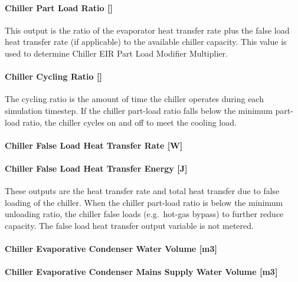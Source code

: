 \paragraph{Chiller Part Load Ratio {[]}}\label{chiller-part-load-ratio-1}

This output is the ratio of the evaporator heat transfer rate plus the false load heat transfer rate (if applicable) to the available chiller capacity. This value is used to determine Chiller EIR Part Load Modifier Multiplier.

\paragraph{Chiller Cycling Ratio {[]}}\label{chiller-cycling-ratio-1}

The cycling ratio is the amount of time the chiller operates during each simulation timestep. If the chiller part-load ratio falls below the minimum part-load ratio, the chiller cycles on and off to meet the cooling load.

\paragraph{Chiller False Load Heat Transfer Rate {[}W{]}}\label{chiller-false-load-heat-transfer-rate-w}

\paragraph{Chiller False Load Heat Transfer Energy {[}J{]}}\label{chiller-false-load-heat-transfer-energy-j}

These outputs are the heat transfer rate and total heat transfer due to false loading of the chiller. When the chiller part-load ratio is below the minimum unloading ratio, the chiller false loads (e.g.~hot-gas bypass) to further reduce capacity. The false load heat transfer output variable is not metered.

\paragraph{Chiller Evaporative Condenser Water Volume {[}m3{]}}\label{chiller-evaporative-condenser-water-volume-m3}

\paragraph{Chiller Evaporative Condenser Mains Supply Water Volume {[}m3{]}}\label{chiller-evaporative-condenser-mains-supply-water-volume-m3}

